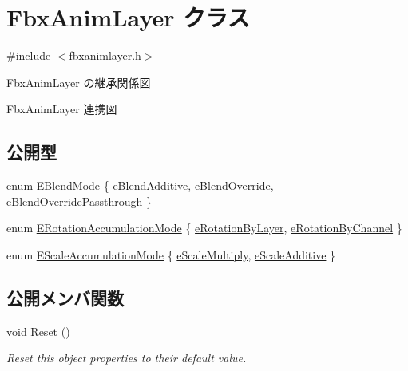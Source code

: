 \hypertarget{class_fbx_anim_layer}{}\section{Fbx\+Anim\+Layer クラス}
\label{class_fbx_anim_layer}


{\ttfamily \#include $<$fbxanimlayer.\+h$>$}



Fbx\+Anim\+Layer の継承関係図


Fbx\+Anim\+Layer 連携図
\subsection*{公開型}
\begin{DoxyCompactItemize}
\item 
enum \hyperlink{class_fbx_anim_layer_abb1e650203e91ff090773239994e802a}{E\+Blend\+Mode} \{ \hyperlink{class_fbx_anim_layer_abb1e650203e91ff090773239994e802aae60dd39593c8806694f8cedb0c14b09b}{e\+Blend\+Additive}, 
\hyperlink{class_fbx_anim_layer_abb1e650203e91ff090773239994e802aaf8232b445a780774bcb8b76ee37291e5}{e\+Blend\+Override}, 
\hyperlink{class_fbx_anim_layer_abb1e650203e91ff090773239994e802aa9551a7380fccde36fd35f532aa826a7a}{e\+Blend\+Override\+Passthrough}
 \}
\item 
enum \hyperlink{class_fbx_anim_layer_a11bad6dbac61cc3965624a0622e90b38}{E\+Rotation\+Accumulation\+Mode} \{ \hyperlink{class_fbx_anim_layer_a11bad6dbac61cc3965624a0622e90b38a51036262864495602654d22f83f101da}{e\+Rotation\+By\+Layer}, 
\hyperlink{class_fbx_anim_layer_a11bad6dbac61cc3965624a0622e90b38a5212817a9e2cfdd21688930bd5fc167a}{e\+Rotation\+By\+Channel}
 \}
\item 
enum \hyperlink{class_fbx_anim_layer_aec9cfaa528bee6739ba4317964d123b0}{E\+Scale\+Accumulation\+Mode} \{ \hyperlink{class_fbx_anim_layer_aec9cfaa528bee6739ba4317964d123b0af962df864ef1dead2f88ade13f4262d0}{e\+Scale\+Multiply}, 
\hyperlink{class_fbx_anim_layer_aec9cfaa528bee6739ba4317964d123b0a0d79b9c4219c50d434746d7062046123}{e\+Scale\+Additive}
 \}
\end{DoxyCompactItemize}
\subsection*{公開メンバ関数}
\begin{DoxyCompactItemize}
\item 
void \hyperlink{class_fbx_anim_layer_acd87646f48b6387952fd3ca257133774}{Reset} ()
\begin{DoxyCompactList}\small\item\em Reset this object properties to their default value. \end{DoxyCompactList}\end{DoxyCompactItemize}
